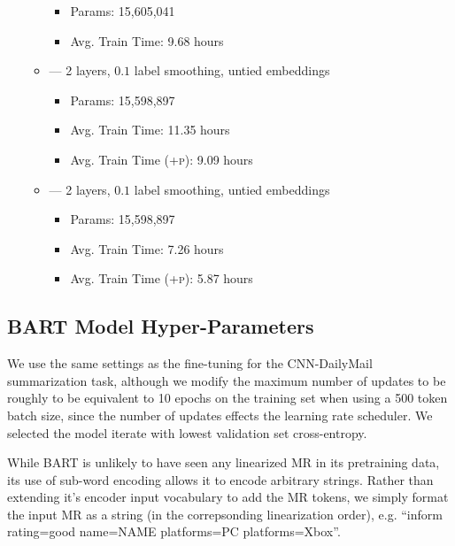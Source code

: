 \begin{itemize}
\begin{itemize}
        \begin{itemize}
            \item Params: 15,605,041
            \item Avg. Train Time: 9.68 hours
        \end{itemize}
    \item {} --- 2 layers, $0.1$ label smoothing, untied embeddings
        \begin{itemize}
            \item Params: 15,598,897
            \item Avg. Train Time: 11.35 hours
            \item Avg. Train Time (\textsc{+p}): 9.09 hours
        \end{itemize}
    \item {} --- 2 layers, $0.1$ label smoothing, untied embeddings
        \begin{itemize}
            \item Params: 15,598,897
            \item Avg. Train Time: 7.26 hours
            \item Avg. Train Time (\textsc{+p}): 5.87 hours
        \end{itemize}
\end{itemize}
\end{itemize}



\subsection{BART Model Hyper-Parameters}

We use the same settings as the fine-tuning for the CNN-DailyMail 
summarization task,
although we modify the maximum number of updates to be roughly to be 
equivalent to 10 epochs on the training set when using a 500 token batch
size, since 
the number of updates effects
the learning rate scheduler. We selected the model iterate with 
lowest validation set cross-entropy. 

While BART is unlikely to have seen any linearized MR in its pretraining
data, its use of sub-word encoding  allows it to encode
arbitrary strings. Rather than extending it's encoder input vocabulary to
add the MR tokens, we simply format the input MR as a string 
(in the correpsonding linearization order), e.g. ``inform rating=good name=NAME platforms=PC platforms=Xbox''.



